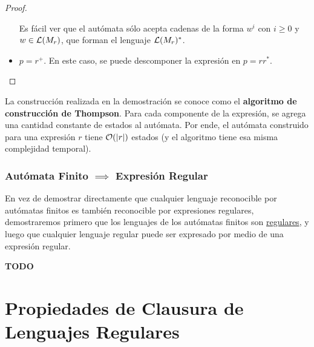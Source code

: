 \begin{proof}
\begin{itemize}
\begin{figure}[H]
              \end{figure}

              Es fácil ver que el autómata sólo acepta cadenas de la forma $w^i$ con $i \geq 0$ y $w \in \mathcal{L}(M_r)$, que forman el lenguaje $\mathcal{L}(M_r)^*$.

        \item $p = r^+$. En este caso, se puede descomponer la expresión en $p = rr^*$.
    \end{itemize}
\end{proof}

La construcción realizada en la demostración se conoce como el \textbf{algoritmo de construcción de Thompson}. Para cada componente de la expresión, se agrega una cantidad constante de estados al autómata. Por ende, el autómata construido para una expresión $r$ tiene $\mathcal{O}(|r|)$ estados (y el algoritmo tiene esa misma complejidad temporal).

\subsubsection{Autómata Finito $\implies$ Expresión Regular}

En vez de demostrar directamente que cualquier lenguaje reconocible por autómatas finitos es también reconocible por expresiones regulares, demostraremos primero que los lenguajes de los autómatas finitos son \hyperref[lenguaje-regular]{regulares}, y luego que cualquier lenguaje regular puede ser expresado por medio de una expresión regular.

\textbf{TODO}

\section{Propiedades de Clausura de Lenguajes Regulares}

